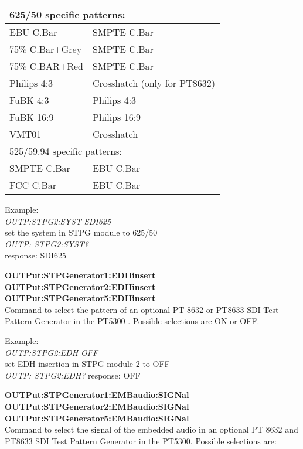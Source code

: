 \begin{tabular}{|l@{$\rightarrow$}l|}
\hline
\multicolumn{2}{|l|}{625/50 specific patterns:} \\ \hline
EBU C.Bar 				& SMPTE C.Bar \\ \hline
75\% C.Bar+Grey 	& SMPTE C.Bar \\ \hline
75\% C.BAR+Red 		& SMPTE C.Bar \\ \hline
Philips 4:3 			& Crosshatch (only for PT8632) \\ \hline
FuBK 4:3 					& Philips 4:3 \\ \hline
FuBK 16:9 				& Philips 16:9 \\ \hline
VMT01 						& Crosshatch \\ \hline
\multicolumn{2}{|l|}{525/59.94 specific patterns:} \\ \hline
SMPTE C.Bar 			& EBU C.Bar \\ \hline
FCC C.Bar 				& EBU C.Bar \\ \hline
\end{tabular}

Example:\\
\textit{OUTP:STPG2:SYST SDI625}\\
set the system in STPG module to 625/50\\
\textit{OUTP: STPG2:SYST?}\\ response: SDI625

\textbf{OUTPut:STPGenerator1:EDHinsert}\\
\textbf{OUTPut:STPGenerator2:EDHinsert}\\
\textbf{OUTPut:STPGenerator5:EDHinsert}\\
Command to select the pattern of an optional PT 8632 or PT8633 SDI Test Pattern Generator in the PT5300 . Possible selections are ON or OFF.

Example:\\
\textit{OUTP:STPG2:EDH OFF}\\
set EDH insertion in STPG module 2 to OFF\\
\textit{OUTP: STPG2:EDH?}
response: OFF

\textbf{OUTPut:STPGenerator1:EMBaudio:SIGNal}\\
\textbf{OUTPut:STPGenerator2:EMBaudio:SIGNal}\\
\textbf{OUTPut:STPGenerator5:EMBaudio:SIGNal}\\
Command to select the signal of the embedded audio in an optional PT 8632 and PT8633 SDI Test Pattern Generator in the PT5300. Possible selections are:

